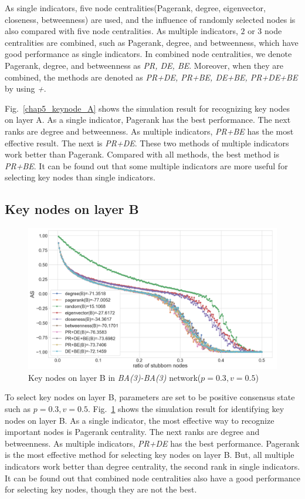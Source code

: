 As single indicators, five node centralities(Pagerank, degree, eigenvector, closeness, betweenness) are used, and the influence of randomly selected nodes is also compared with five node centralities. As multiple indicators, $2$ or $3$ node centralities are combined, such as Pagerank, degree, and betweenness, which have good performance as single indicators. In combined node centralities, we denote Pagerank, degree, and betweenness as \textit{PR, DE, BE}. Moreover, when they are combined, the methods are denoted as \textit{PR+DE, PR+BE, DE+BE, PR+DE+BE} by using \textit{+}. 

Fig.~\ref{chap5_keynode_A} shows the simulation result for recognizing key nodes on layer A. As a single indicator, Pagerank has the best performance. The next ranks are degree and betweenness. As multiple indicators, \textit{PR+BE} has the most effective result. The next is \textit{PR+DE}. These two methods of multiple indicators work better than Pagerank. Compared with all methods, the best method is \textit{PR+BE}. It can be found out that some multiple indicators are more useful for selecting key nodes than single indicators. \\

\subsection{Key nodes on layer B}
\label{layerB}
\begin{figure}[!htb]
	\centering
	\includegraphics[width=\hsize]{figure/chap5_keynode_B.png}
	\caption{Key nodes on layer B in \textit{BA(3)-BA(3)} network($p=0.3, v=0.5$)}
	\label{chap5_keynode_B}
\end{figure}

To select key nodes on layer B, parameters are set to be positive consensus state such as $p=0.3, v=0.5$. Fig.~\ref{chap5_keynode_B} shows the simulation result for identifying key nodes on layer B. As a single indicator, the most effective way to recognize important nodes is Pagerank centrality. The next ranks are degree and betweenness. As multiple indicators, \textit{PR+DE} has the best performance. Pagerank is the most effective method for selecting key nodes on layer B. But, all multiple indicators work better than degree centrality, the second rank in single indicators. It can be found out that combined node centralities also have a good performance for selecting key nodes, though they are not the best. \\

